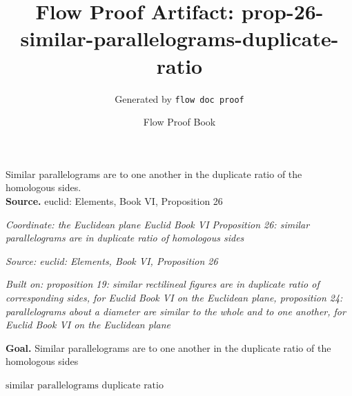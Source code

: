 \documentclass[11pt]{article}
\title{Flow Proof Artifact: prop-26-similar-parallelograms-duplicate-ratio}
\author{Generated by \texttt{flow doc proof}}
\date{Flow Proof Book}
\theoremstyle{definition}
\begin{document}
\maketitle
Similar parallelograms are to one another in the duplicate ratio of the homologous sides.\\[0.5em]
\textbf{Source.} euclid: Elements, Book VI, Proposition 26\\[0.5em]
\bigskip
{}\par
\smallskip\noindent\textit{Coordinate: the Euclidean plane \cdot Euclid Book VI \cdot Proposition 26: similar parallelograms are in duplicate ratio of homologous sides}\par
\smallskip\noindent\textit{Source: euclid: Elements, Book VI, Proposition 26}\par
\smallskip\noindent\textit{Built on: proposition 19: similar rectilineal figures are in duplicate ratio of corresponding sides, for Euclid Book VI on the Euclidean plane, proposition 24: parallelograms about a diameter are similar to the whole and to one another, for Euclid Book VI on the Euclidean plane}\par
\medskip
\noindent\textbf{Goal.} Similar parallelograms are to one another in the duplicate ratio of the homologous sides\par
\noindent$\displaystyle \text{similar parallelograms duplicate ratio}$\par
\medskip
\noindent
\end{document}
